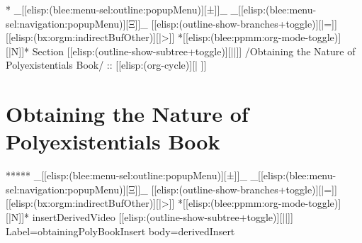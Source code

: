 \begin{whenOrg}
\begin{verblatex}
\begin{frame}[fragile,plain,label=twoVolumesConcepts]
\begin{columns}
    \end{columns}




\end{frame}
\end{verblatex}



\begin{whenOrg}
*  _[[elisp:(blee:menu-sel:outline:popupMenu)][±]]_ _[[elisp:(blee:menu-sel:navigation:popupMenu)][Ξ]]_ [[elisp:(outline-show-branches+toggle)][|=]] [[elisp:(bx:orgm:indirectBufOther)][|>]] *[[elisp:(blee:ppmm:org-mode-toggle)][|N]]*  Section    [[elisp:(outline-show-subtree+toggle)][||]]   /Obtaining the Nature of Polyexistentials Book/ ::  [[elisp:(org-cycle)][| ]]
\end{whenOrg}

\section{Obtaining the Nature of Polyexistentials Book}

\begin{whenOrg}
*****  _[[elisp:(blee:menu-sel:outline:popupMenu)][±]]_ _[[elisp:(blee:menu-sel:navigation:popupMenu)][Ξ]]_ [[elisp:(outline-show-branches+toggle)][|=]] [[elisp:(bx:orgm:indirectBufOther)][|>]] *[[elisp:(blee:ppmm:org-mode-toggle)][|N]]*  insertDerivedVideo [[elisp:(outline-show-subtree+toggle)][||]] Label=obtainingPolyBookInsert  body=derivedInsert
\end{whenOrg}


\end{whenOrg}
